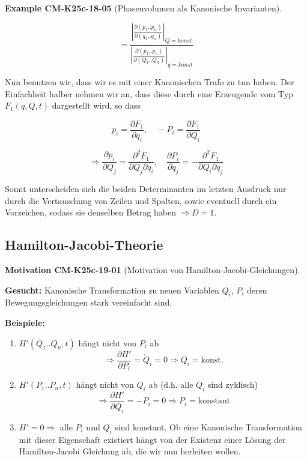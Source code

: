 \documentclass[10pt, letterpaper]{article}
\newcommand{\CustomHeading}[3]{%
  \par\medskip\noindent%
  \textbf{#1 #2} \textnormal{(#3)}.\enskip%
}
\newenvironment{EXA}[2]{\begin{unitbox}\CustomHeading{Example}{#1}{#2}}{\end{unitbox}}
\newenvironment{MOT}[2]{\begin{unitbox}\CustomHeading{Motivation}{#1}{#2}}{\end{unitbox}}
\begin{document}
\begin{EXA}{CM-K25c-18-05}{Phasenvolumen als Kanonische Invarianten}
\[
= \frac{\left|\frac{\partial(p_1..p_n)}{\partial(q_1..q_n)}\right|_{Q=konst}}{\left|\frac{\partial(p_1..p_n)}{\partial(Q_1..Q_n)}\right|_{q=konst}}
\]

Nun benutzen wir, dass wir es mit einer Kanonischen Trafo zu tun haben. Der Einfachheit halber nehmen wir an, dass diese durch eine Erzeugende vom Typ $F_1(q,Q,t)$ dargestellt wird, so dass

\[
p_i = \frac{\partial F_1}{\partial q_i}, \quad -P_i = \frac{\partial F_1}{\partial Q_i}
\]

\[
\Rightarrow \frac{\partial p_i}{\partial Q_j} = \frac{\partial^2 F_1}{\partial Q_j \partial q_i}, \quad \frac{\partial P_i}{\partial q_j} = -\frac{\partial^2 F_1}{\partial Q_i \partial q_j}
\]

Somit unterscheiden sich die beiden Determinanten im letzten Ausdruck nur durch die Vertauschung von Zeilen und Spalten, sowie eventuell durch ein Vorzeichen, sodass sie denselben Betrag haben $\Rightarrow D = 1$.
\end{EXA}





\pagebreak

\subsection{Hamilton-Jacobi-Theorie}

\begin{MOT}{CM-K25c-19-01}{Motivation von Hamilton-Jacobi-Gleichungen}
\textbf{Gesucht:} Kanonische Transformation zu neuen Variablen $Q_i$, $P_i$ deren Bewegungsgleichungen stark vereinfacht sind.

\textbf{Beispiele:} 
\begin{enumerate}
\item $H'(Q_1..Q_n,t)$ hängt nicht von $P_i$ ab
\[\Rightarrow \frac{\partial H'}{\partial P_i} = \dot{Q}_i = 0 \Rightarrow Q_i = \text{konst.}\]

\item $H'(P_1..P_n,t)$ hängt nicht von $Q_i$ ab (d.h. alle $Q_i$ sind zyklisch)
\[\Rightarrow \frac{\partial H'}{\partial Q_i} = -\dot{P}_i = 0 \Rightarrow P_i = \text{konstant}\]

\item $H' = 0 \Rightarrow$ alle $P_i$ und $Q_i$ sind konstant. Ob eine Kanonische Transformation mit dieser Eigenschaft existiert hängt von der Existenz einer Lösung der Hamilton-Jacobi Gleichung ab, die wir nun herleiten wollen.
\end{enumerate}
\end{MOT}
\end{document}
